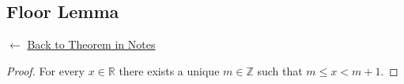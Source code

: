 
\subsection*{Floor Lemma}
\label{prf:floor-lemma}

\begin{remark*}[Return]
$\leftarrow$ \hyperref[lem:floor-lemma]{Back to Theorem in Notes}
\end{remark*}

\begin{proof}
\Claim For every $x \in \mathbb{R}$ there exists a unique $m \in \mathbb{Z}$ such that $m \le x < m+1$.

\end{proof}

\begin{remark*}
\end{remark*}

\begin{remark*}[Dependencies]
\end{remark*}
